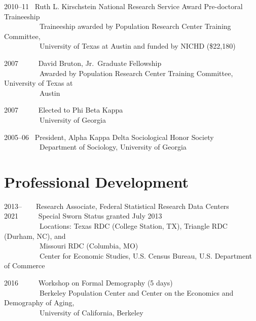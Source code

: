\documentclass[11pt,]{article}
\begin{document}
2010--11 ~Ruth L. Kirschstein National Research Service Award
Pre-doctoral Traineeship\\
\hspace*{0.333em} ~ ~ ~ ~ ~ ~ Traineeship awarded by Population Research
Center Training Committee,\\
\hspace*{0.333em} ~ ~ ~ ~ ~ ~ University of Texas at Austin and funded
by NICHD (\$22,180)

2007 ~ ~ ~ David Bruton, Jr.~Graduate Fellowship\\
\hspace*{0.333em} ~ ~ ~ ~ ~ ~ Awarded by Population Research Center
Training Committee, University of Texas at\\
\hspace*{0.333em} ~ ~ ~ ~ ~ ~ Austin

2007 ~ ~ ~ Elected to Phi Beta Kappa\\
\hspace*{0.333em} ~ ~ ~ ~ ~ ~ University of Georgia

2005--06 ~President, Alpha Kappa Delta Sociological Honor Society\\
\hspace*{0.333em} ~ ~ ~ ~ ~ ~ Department of Sociology, University of
Georgia

\hypertarget{professional-development}{%
\section{Professional Development}\label{professional-development}}

2013-- ~ ~ Research Associate, Federal Statistical Research Data
Centers\\
2021 ~ ~ ~ Special Sworn Status granted July 2013\\
\hspace*{0.333em} ~ ~ ~ ~ ~ ~ Locations: Texas RDC (College Station,
TX), Triangle RDC (Durham, NC), and\\
\hspace*{0.333em} ~ ~ ~ ~ ~ ~ Missouri RDC (Columbia, MO)\\
\hspace*{0.333em} ~ ~ ~ ~ ~ ~ Center for Economic Studies, U.S. Census
Bureau, U.S. Department of Commerce

2016 ~ ~ ~ Workshop on Formal Demography (5 days)\\
\hspace*{0.333em} ~ ~ ~ ~ ~ ~ Berkeley Population Center and Center on
the Economics and Demography of Aging,\\
\hspace*{0.333em} ~ ~ ~ ~ ~ ~ University of California, Berkeley
\end{document}
